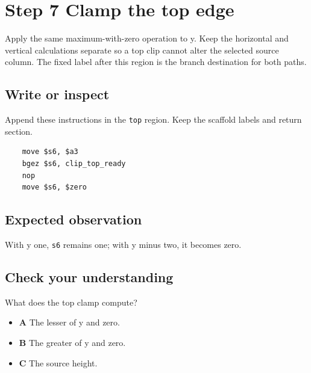 \section{Step 7 Clamp the top edge}\label{blit-s07}

Apply the same maximum-with-zero operation to y. Keep the horizontal and vertical calculations separate so a top clip cannot alter the selected source column. The fixed label after this region is the branch destination for both paths.

\subsection{Write or inspect}
Append these instructions in the \texttt{top} region. Keep the scaffold labels and return section.

\begin{verbatim}
    move $s6, $a3
    bgez $s6, clip_top_ready
    nop
    move $s6, $zero
\end{verbatim}

\subsection{Expected observation}
With y one, \texttt{s6} remains one; with y minus two, it becomes zero.

\subsection{Check your understanding}
What does the top clamp compute?

\begin{itemize}
  \item \textbf{A} The lesser of y and zero.
  \item \textbf{B} The greater of y and zero.
  \item \textbf{C} The source height.
\end{itemize}
